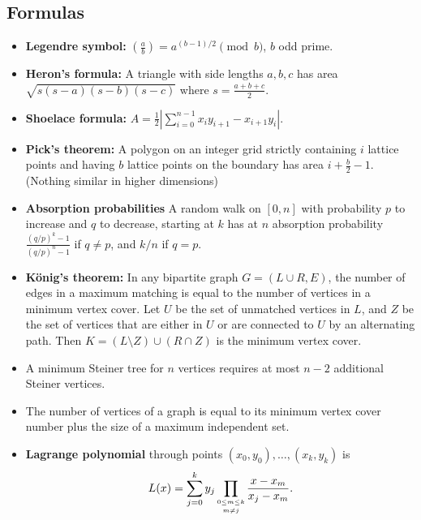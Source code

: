 \documentclass[8pt,a4paper,landscape,oneside]{amsart}
\newenvironment{myitemize}
{\begin{itemize}[leftmargin=.3cm]
	\setlength{\itemsep}{0pt}
	\setlength{\parskip}{0pt}
	\setlength{\parsep}{0pt}     }
{ \end{itemize}                  }
\begin{document}
\begin{multicols*}{3}
\section{Formulas}


\begin{myitemize}
	\item \textbf{Legendre symbol:} $\left(\frac{a}{b}\right) = a^{(b-1)/2} \pmod{b}$, $b$ odd prime.
	\item \textbf{Heron's formula:} A triangle with side lengths
		$a,b,c$ has area $\sqrt{s(s-a)(s-b)(s-c)}$ where $s =
		\frac{a+b+c}{2}$.
	\item \textbf{Shoelace formula:} $A = \frac12 |\sum_{i=0}^{n-1} x_iy_{i+1} - x_{i+1}y_i|$.
	\item \textbf{Pick's theorem:} A polygon on an integer grid
		strictly containing $i$ lattice points and having $b$ lattice
		points on the boundary has area $i + \frac{b}{2} - 1$. (Nothing
		similar in higher dimensions)
	\item \textbf{Absorption probabilities} A random walk on $[0,n]$ with probability $p$ to increase and $q$ to decrease, starting at $k$ has at $n$ absorption probability $\frac{(q/p)^k-1}{(q/p)^n-1}$ if $q \not= p$, and $k/n$ if $q = p$.
	\item \textbf{König's theorem:} In any bipartite graph $G=(L\cup R,E)$, the number
		of edges in a maximum matching is equal to the number of
		vertices in a minimum vertex cover. Let $U$ be the set of
		unmatched vertices in $L$, and $Z$ be the set of vertices that
		are either in $U$ or are connected to $U$ by an alternating
		path. Then $K=(L\setminus Z)\cup(R\cap Z)$ is the minimum
		vertex cover.
	\item A minimum Steiner tree for $n$ vertices requires at most $n-2$ additional Steiner vertices.
	\item The number of vertices of a graph is equal to its minimum
		vertex cover number plus the size of a maximum independent set.
	\item \textbf{Lagrange polynomial} through points $(x_0,y_0),\ldots,(x_k,y_k)$ is
	\[
		L(x) = \sum_{j=0}^k y_j \prod_{\shortstack{$\scriptscriptstyle 0\leq m \leq k$ \\ $\scriptscriptstyle m\neq j$}} \frac{x-x_m}{x_j - x_m}.
\]
\end{myitemize}
\end{multicols*}
\end{document}
